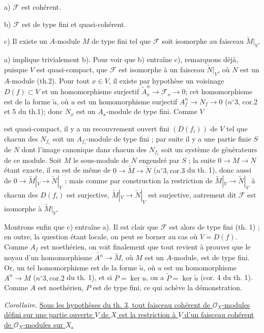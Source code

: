 a) $\mathcal{F}$ est cohérent.

b) $\mathcal{F}$ est de type fini et quasi-cohérent.

c) Il existe un $A$-module $M$ de type fini tel que $\mathcal{F}$ soit isomorphe au faisceau $\widetilde{M}|_V$.

a) implique trivialement b). Pour voir que b) entraîne c), remarquons déjà, puisque $V$ est quasi-compact, que $\mathcal{F}$ est isomorphe à un faisceau $\widetilde{N}|_V$, où $N$ est un $A$-module (th.2). Pour tout $x \in V$, il existe par hypothèse un voisinage $D(f) \subset V$ et un homomorphisme surjectif $\widetilde{A}^n_x \to \mathcal{F}_x \to 0$; cet homomorphisme est de la forme $\widetilde{u}$, où $u$ est un homomorphisme surjectif $A^n_f \to N_f \to 0$ ($n^\circ 3$, cor.2 et 5 du th.1); donc $N_x$ est un $A_x$-module de type fini. Comme $V$

\newpage


est quasi-compact, il y a un recouvrement ouvert fini $(D(f_i))$ de $V$ tel que chacun des $N_{f_i}$ soit un $A_{f_i}$-module de type fini ; par suite il y a une partie finie $S$ de $N$ dont l'image canonique dans chacun des $N_{f_i}$ soit un système de générateurs de ce module. Soit $M$ le sous-module de $N$ engendré par $S$ ; la suite $0 \to M \to N$ étant exacte, il en est de même de $0 \to \widetilde{M} \to \widetilde{N}$ ($n^\circ 3, \text{cor.} 3$ du th. 1), donc aussi de $0 \to \widetilde{M}|_V \to \widetilde{N}|_V$ ; mais comme par construction la restriction de $\widetilde{M}|_V \to \widetilde{N}|_V$ à chacun des $D(f_i)$ est surjective, $\widetilde{M}|_V \to \widetilde{N}|_V$ est surjective, autrement dit $\mathcal{F}$ est isomorphe à $\widetilde{M}|_V$.

Montrons enfin que c) entraîne a). Il est clair que $\mathcal{F}$ est alors de type fini (th. 1) ; en outre, la question étant locale, on peut se borner au cas où $V = D(f)$. Comme $A_f$ est noethérien, on voit finalement que tout revient à prouver que le noyau d'un homomorphisme $\widetilde{A^n} \to \widetilde{M}$, où $M$ est un $A$-module, est de type fini. Or, un tel homomorphisme est de la forme $\widetilde{u}$, où $u$ est un homomorphisme $A^n \to M$ ($n^\circ 3, \text{cor.} 2$ du th. 1), et si $P = \ker u$, on a $\widetilde{P} = \ker \widetilde{u}$ (cor. 4 du th. 1). Comme $A$ est noethérien, $P$ est de type fini, ce qui achève la démonstration.

\emph{Corollaire.} \underline{Sous les hypothèses du th. 3, tout faisceau cohérent de $\mathcal{O}_X$-modules défini sur une partie ouverte $V$ de $X$ est la restriction à $V$ d'un faisceau cohérent de $\mathcal{O}_X$-modules sur $X$.}

